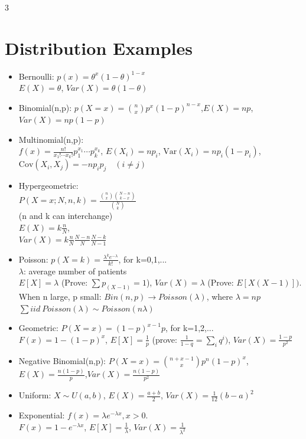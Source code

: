 \documentclass[a4paper,10pt]{article}
\begin{document}
\begin{multicols}{3}
\begin{itemize}
\end{itemize}
\section*{Distribution Examples}
\begin{itemize}
    \item Bernoulli: $p(x)=\theta^x(1-\theta)^{1-x}$\\
    $E(X)=\theta$, $Var(X)=\theta (1-\theta)$
    \item Binomial(n,p): $p(X=x)=\binom{n}{x}p^x(1-p)^{n-x}$,$E(X)=np$, $Var(X)=np(1-p)$\\
    \item Multinomial(n,p):\\ $f(x)=\frac{n!}{x_1! \cdots x_k!} p_1^{x_1} \cdots p_k^{x_k}$, $E(X_i) = n p_i$, $\text{Var}(X_i) = n p_i (1 - p_i)$, $\text{Cov}(X_i, X_j) = -n p_i p_j \quad (i \neq j)$
    \item Hypergeometric:\\ $P(X=x;N,n,k)=\frac{\binom{n}{x}\binom{N-n}{k-x}}{\binom{N}{k}}$\\
    (n and k can interchange)\\
    $E(X)=k\frac{n}{N}$,\\ $Var(X)=k\frac{n}{N}\frac{N-n}{N}\frac{N-k}{N-1}$
    \item Poisson: $p(X=k)=\frac{\lambda^ke^{-\lambda}}{k!}$, for k=0,1,...
    \\$\lambda$: average number of patients\\
    $E[X]=\lambda$ (Prove: $\sum p_{(X-1)}=1$), $Var(X)=\lambda$ (Prove: $E[X(X-1)])$.\\
    When n large, p small: $Bin(n,p)\rightarrow Poisson(\lambda)$, where $\lambda=np$\\
    $\sum iid\ Poisson(\lambda)\sim Poisson(n\lambda)$
    \item Geometric: $P(X=x)=(1-p)^{x-1}p$, for k=1,2,... $F(x)=1-(1-p)^x$, $E[X]=\frac{1}{p}$ (prove: $\frac{1}{1-q}=\sum_i q^i)$, $Var(X)=\frac{1-p}{p^2}$
    \item Negative Binomial(n,p): $P(X=x)=\binom{n+x-1}{x}p^n(1-p)^x$,$E(X)=\frac{n(1-p)}{p}$,$Var(X)=\frac{n(1-p)}{p^2}$
    \item Uniform: $X\sim U(a,b)$, $E(X)=\frac{a+b}{2}$, $Var(X)=\frac{1}{12}(b-a)^2$
    \item Exponential: $f(x)=\lambda e^{-\lambda x},x>0$.\\ $F(x)=1-e^{-\lambda x}$,
    $E[X]=\frac{1}{\lambda}$, $Var(X)=\frac{1}{\lambda^2}$

\end{itemize}
\end{multicols}
\end{document}
